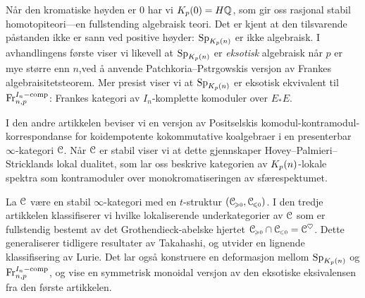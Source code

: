 Når den kromatiske høyden er $0$ har vi $K_p(0) = H\mathbb{Q}$, som gir oss rasjonal stabil homotopiteori---en fullstending algebraisk teori. Det er kjent at den tilsvarende påstanden ikke er sann ved positive høyder: $\mathrm{Sp}_{K_p(n)}$ er ikke algebraisk. I avhandlingens første viser vi likevell at $\mathrm{Sp}_{K_p(n)}$ er \emph{eksotisk} algebraisk når $p$ er mye større enn $n$,ved å anvende Patchkoria--Pstr\a{}gowskis versjon av Frankes algebraisitetsteorem. Mer presist viser vi at $\mathrm{Sp}_{K_p(n)}$ er eksotisk ekvivalent til $\mathrm{Fr}_{n,p}^{I_n-\mathrm{comp}}$: Frankes kategori av $I_n$-komplette komoduler over $E_*E$. 

I den andre artikkelen beviser vi en versjon av Positselskis komodul-kontramodul-korrespondanse for koidempotente kokommutative koalgebraer i en presenterbar $\infty$-kategori $\EuScript{C}$. Når $\EuScript{C}$ er stabil viser vi at dette gjennskaper Hovey--Palmieri--Stricklands lokal dualitet, som lar oss beskrive kategorien av ${K_p(n)}$-lokale spektra som kontramoduler over monokromatiseringen av sfærespektumet. 

La $\EuScript{C}$ være en stabil $\infty$-kategori med en $t$-struktur $(\EuScript{C}_{\hspace{-1pt}\scriptscriptstyle\geqslant 0}, \EuScript{C}_{\hspace{-1pt}\scriptscriptstyle\leqslant 0})$. I den tredje artikkelen klassifiserer vi hvilke lokaliserende underkategorier av $\EuScript{C}$ som er fullstendig bestemt av det Grothendieck-abelske hjertet $\EuScript{C}_{\hspace{-1pt}\scriptscriptstyle\geqslant 0} \cap \EuScript{C}_{\hspace{-1pt}\scriptscriptstyle\leqslant 0} = \EuScript{C}^\heartsuit$. Dette generaliserer tidligere resultater av Takahashi, og utvider en lignende klassifisering av Lurie. Det lar også konstruere en deformasjon mellom $\mathrm{Sp}_{K_p(n)}$ og $\mathrm{Fr}_{n,p}^{I_n-\mathrm{comp}}$, og vise en symmetrisk monoidal versjon av den eksotiske eksivalensen fra den første artikkelen. 




